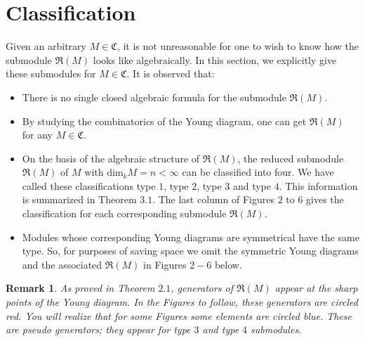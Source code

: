 \documentclass[12pt,a4paper]{article}
\newcommand{\noi}{\noindent}
\newtheorem{rem}{Remark}[section]
\begin{document}
		\section{Classification}
		\begin{paragraph}\noi
			Given an arbitrary $M\in \mathfrak{C}$, it is not unreasonable for one to wish to know how the submodule $\mathfrak{R}(M)$ looks like algebraically. In this section, we explicitly give these submodules for $M\in \mathfrak{C}$. It is observed that: 
		\end{paragraph}
		\begin{itemize}
			\item There is no single closed algebraic formula for the submodule $\mathfrak{R}(M)$.
			\item  By studying the combinatorics of the Young diagram, one can get $\mathfrak{R}(M)$ for any $M\in \mathfrak{C}$.
			\item  On the basis of the algebraic structure of $\mathfrak{R}(M)$, the reduced submodule $\mathfrak{R}(M)$ of $M$ with $\text{dim}_kM=n <\infty $ can be classified into four. We have called these classifications type $1$, type $2$, type $3$ and type $4$. This information is summarized in Theorem $3.1$. The last column of Figures $2$ to $6$ gives the classification for each corresponding submodule $\mathfrak{R}(M)$.
			\item  Modules whose corresponding Young diagrams are symmetrical have the same type. So, for purposes of saving space we omit the symmetric Young diagrams and the associated $\mathfrak{R}(M)$ in Figures $2-6$ below.
		\end{itemize}
		\begin{rem}
			\normalfont
			As proved in Theorem $2.1$, generators of $\mathfrak{R}(M)$ appear at the sharp points of the Young diagram. In the Figures to follow, these generators are circled red. You will realize that for some Figures some elements are circled blue. These are pseudo generators; they appear for type $3$ and type $4$ submodules.
		\end{rem}
\end{document}

